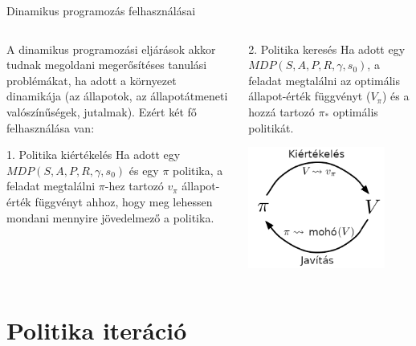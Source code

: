\documentclass[english, aspectratio=169]{beamer}
\makeatletter
\let\origtableofcontents=\tableofcontents
\def\tableofcontents{\@ifnextchar[{\origtableofcontents}{\gobbletableofcontents}}
\def\gobbletableofcontents#1{\origtableofcontents}
\makeatother
\begin{document}
\begin{frame}{Dinamikus programozás felhasználásai}
\begin{columns}
\begin{column}{.5\textwidth}
A dinamikus programozási eljárások akkor tudnak megoldani megerősítéses tanulási problémákat, ha adott a környezet dinamikája (az állapotok, az állapotátmeneti valószínűségek, jutalmak). Ezért két fő felhasználása van:\\
\begin{block}{1. Politika kiértékelés}
Ha adott egy $MDP(S,A,P,R,\gamma,s_{0})$ és egy $\pi$ politika, a feladat megtalálni $\pi$-hez tartozó $v_{\pi}$ állapot-érték függvényt ahhoz, hogy meg lehessen mondani mennyire jövedelmező a politika. 
\end{block}
\end{column}
\begin{column}{.5\textwidth}
\begin{block}{2. Politika keresés}
Ha adott egy $MDP(S,A,P,R,\gamma,s_{0})$, a feladat megtalálni az optimális állapot-érték függvényt ($V_{\pi}$) és a hozzá tartozó $\pi_{*}$ optimális politikát. 
\end{block}
\begin{center}
\includegraphics[width=4.5cm, keepaspectratio]{images/solving_9.png}
\end{center}
\end{column}
\end{columns}
\end{frame}

\section{Politika iteráció}

\begin{frame}
\tableofcontents[currentsection]
\end{frame}
\end{document}
